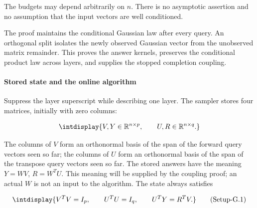 
The budgets may depend arbitrarily on \(n\). There is no asymptotic assertion and no assumption that the input vectors are well conditioned.



The proof maintains the conditional Gaussian law after every query. An orthogonal split isolates the newly observed Gaussian vector from the unobserved matrix remainder. This proves the answer kernels, preserves the conditional product law across layers, and supplies the stopped completion coupling.


\paragraph{Stored state and the online algorithm}
\label{int:setup-sampler-2}
\mbox{}\par\smallskip


Suppress the layer superscript while describing one layer. The sampler stores four matrices, initially with zero columns:


\begingroup\renewcommand{\theHequation}{intdisplay.1050}
\begin{equation*}
\intdisplay{
V,Y\in\mathbb R^{n\times p},\qquad
 U,R\in\mathbb R^{n\times q}.
}
\end{equation*}
\endgroup


The columns of \(V\) form an orthonormal basis of the span of the forward query vectors seen so far; the columns of \(U\) form an orthonormal basis of the span of the transpose query vectors seen so far. The stored answers have the meaning \(Y=WV\), \(R=W^T U\). This meaning will be supplied by the coupling proof; an actual \(W\) is not an input to the algorithm. The state always satisfies


\label{int:eq-setup-g-1}
\begingroup\renewcommand{\theHequation}{intdisplay.1051}
\begin{equation}
\intdisplay{
V^T V=I_p,\qquad U^T U=I_q,\qquad U^T Y=R^T V.
}
\tag{Setup-G.1}
\label{int:eq-0555-setup-g-1}
\end{equation}
\endgroup


